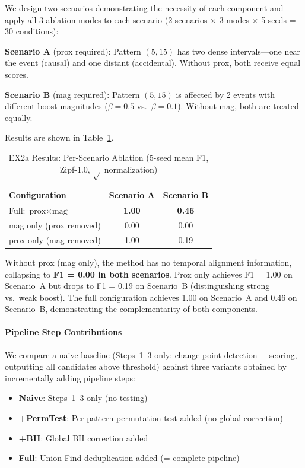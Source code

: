 We design two scenarios demonstrating the necessity of each component
and apply all 3 ablation modes to each scenario
(2 scenarios $\times$ 3 modes $\times$ 5 seeds = 30 conditions):

\noindent\textbf{Scenario A} (prox required):
Pattern $(5, 15)$ has two dense intervals---one near the event (causal)
and one distant (accidental). Without prox, both receive equal scores.

\noindent\textbf{Scenario B} (mag required):
Pattern $(5, 15)$ is affected by 2 events with different boost magnitudes
($\beta=0.5$ vs.\ $\beta=0.1$). Without mag, both are treated equally.

Results are shown in Table~\ref{tab:ex2a}.

\begin{table}[t]
\caption{EX2a Results: Per-Scenario Ablation (5-seed mean F1, Zipf-1.0, $\sqrt{}$ normalization)}
\label{tab:ex2a}
\centering
\begin{tabular}{lcc}
\toprule
Configuration & Scenario A & Scenario B \\
\midrule
Full: $\text{prox} \times \text{mag}$ & \textbf{1.00} & \textbf{0.46} \\
mag only (prox removed)               & 0.00 & 0.00 \\
prox only (mag removed)               & 1.00 & 0.19 \\
\bottomrule
\end{tabular}
\end{table}

Without prox (mag only), the method has no temporal alignment information,
collapsing to \textbf{F1 = 0.00 in both scenarios}.
Prox only achieves F1 = 1.00 on Scenario~A but drops to F1 = 0.19
on Scenario~B (distinguishing strong vs.\ weak boost).
The full configuration achieves 1.00 on Scenario~A and 0.46 on Scenario~B,
demonstrating the complementarity of both components.

\paragraph{Pipeline Step Contributions}
We compare a naive baseline (Steps~1--3 only: change point detection + scoring,
outputting all candidates above threshold) against three variants
obtained by incrementally adding pipeline steps:

\begin{itemize}
\item \textbf{Naive}: Steps~1--3 only (no testing)
\item \textbf{+PermTest}: Per-pattern permutation test added (no global correction)
\item \textbf{+BH}: Global BH correction added
\item \textbf{Full}: Union-Find deduplication added (= complete pipeline)
\end{itemize}

